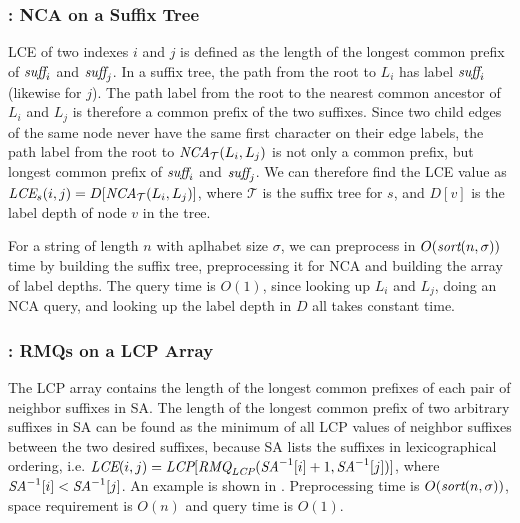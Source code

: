 \documentclass[a4]{article}
\newcommand*{\pref}{\prettyref}
\begin{document}
\subsubsection{: NCA on a Suffix Tree}

LCE of two indexes $i$ and $j$ is defined as the length of the longest common prefix of $\textit{suff}_i$ and $\textit{suff}_j$. In a suffix tree, the path from the root to $L_i$ has label $\textit{suff}_i$ (likewise for $j$). The path label from the root to the nearest common ancestor of $L_i$ and $L_j$ is therefore a common prefix of the two suffixes. Since two child edges of the same node never have the same first character on their edge labels, the path label from the root to $\textit{NCA}_\mathcal{T}(L_i,L_j)$ is not only a common prefix, but longest common prefix of $\textit{suff}_i$ and $\textit{suff}_j$. We can therefore find the LCE value as $\textit{LCE}_s(i,j) = D[\textit{NCA}_\mathcal{T}(L_i,L_j)]$, where $\mathcal{T}$ is the suffix tree for $s$, and $D[v]$ is the label depth of node $v$ in the tree.

For a string of length $n$ with aplhabet size $\sigma$, we can preprocess  in $O(\textit{sort}(n,\sigma))$ time by building the suffix tree, preprocessing it for NCA and building the array of label depths. The query time is $O(1)$, since looking up $L_i$ and $L_j$, doing an NCA query, and looking up the label depth in $D$ all takes constant time.

\subsubsection{: RMQs on a LCP Array}

The LCP array contains the length of the longest common prefixes of each pair of neighbor suffixes in SA. The length of the longest common prefix of two arbitrary suffixes in SA can be found as the minimum of all LCP values of neighbor suffixes between the two desired suffixes, because SA lists the suffixes in lexicographical ordering, i.e. $\textit{LCE}(i,j)=\textit{LCP}[\textit{RMQ}_{\textit{LCP}}(\textit{SA}^{-1}[i] + 1, \textit{SA}^{-1}[j])]$, where $\textit{SA}^{-1}[i] < \textit{SA}^{-1}[j]$. An example is shown in \pref{fig:sa+lcp+min}. Preprocessing time is $O(\textit{sort}(n,\sigma))$, space requirement is $O(n)$ and query time is $O(1)$.
\end{document}
